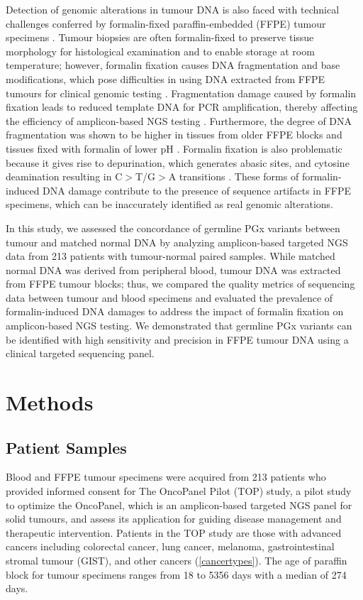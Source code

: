 \documentclass{bmcart}
\begin{document}
Detection of genomic alterations in tumour DNA is also faced with technical challenges conferred by formalin-fixed paraffin-embedded (FFPE) tumour specimens \cite{Do2015,Wong2014}. Tumour biopsies are often formalin-fixed to preserve tissue morphology for histological examination and to enable storage at room temperature; however, formalin fixation causes DNA fragmentation and base modifications, which pose difficulties in using DNA extracted from FFPE tumours for clinical genomic testing \cite{Do2015,Wong2014}. Fragmentation damage caused by formalin fixation leads to reduced template DNA for PCR amplification, thereby affecting the efficiency of amplicon-based NGS testing \cite{Do2015,Wong2014}. Furthermore, the degree of DNA fragmentation was shown to be higher in tissues from older FFPE blocks and tissues fixed with formalin of lower pH \cite{Do2015}. Formalin fixation is also problematic because it gives rise to depurination, which generates abasic sites, and cytosine deamination resulting in C$>$T/G$>$A transitions \cite{Do2015}. These forms of formalin-induced DNA damage contribute to the presence of sequence artifacts in FFPE specimens, which can be inaccurately identified as real genomic alterations.

In this study, we assessed the concordance of germline PGx variants between tumour and matched normal DNA by analyzing amplicon-based targeted NGS data from 213 patients with tumour-normal paired samples. While matched normal DNA was derived from peripheral blood, tumour DNA was extracted from FFPE tumour blocks; thus, we compared the quality metrics of sequencing data between tumour and blood specimens and evaluated the prevalence of formalin-induced DNA damages to address the impact of formalin fixation on amplicon-based NGS testing. We demonstrated that germline PGx variants can be identified with high sensitivity and precision in FFPE tumour DNA using a clinical targeted sequencing panel.


\section*{Methods}

\subsection*{Patient Samples}
Blood and FFPE tumour specimens were acquired from 213 patients who provided informed consent for The OncoPanel Pilot (TOP) study, a pilot study to optimize the OncoPanel, which is an amplicon-based targeted NGS panel for solid tumours, and assess its application for guiding disease management and therapeutic intervention. Patients in the TOP study are those with advanced cancers including colorectal cancer, lung cancer, melanoma, gastrointestinal stromal tumour (GIST), and other cancers (\autoref{cancertypes}). The age of paraffin block for tumour specimens ranges from 18 to 5356 days with a median of 274 days.
\end{document}
